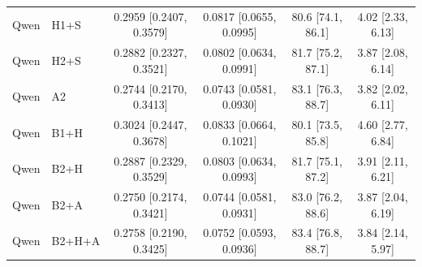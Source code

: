 \documentclass{article}
\begin{document}
\begin{table}[h]
{\begin{tabular}{llcccc}
Qwen & H1+S & 0.2959 [0.2407, 0.3579] & 0.0817 [0.0655, 0.0995] & 80.6 [74.1, 86.1] & 4.02 [2.33, 6.13] \\
Qwen & H2+S & 0.2882 [0.2327, 0.3521] & 0.0802 [0.0634, 0.0991] & 81.7 [75.2, 87.1] & 3.87 [2.08, 6.14] \\
Qwen & A2 & 0.2744 [0.2170, 0.3413] & 0.0743 [0.0581, 0.0930] & 83.1 [76.3, 88.7] & 3.82 [2.02, 6.11] \\
Qwen & B1+H & 0.3024 [0.2447, 0.3678] & 0.0833 [0.0664, 0.1021] & 80.1 [73.5, 85.8] & 4.60 [2.77, 6.84] \\
Qwen & B2+H & 0.2887 [0.2329, 0.3529] & 0.0803 [0.0634, 0.0993] & 81.7 [75.1, 87.2] & 3.91 [2.11, 6.21] \\
Qwen & B2+A & 0.2750 [0.2174, 0.3421] & 0.0744 [0.0581, 0.0931] & 83.0 [76.2, 88.6] & 3.87 [2.04, 6.19] \\
Qwen & B2+H+A & 0.2758 [0.2190, 0.3425] & 0.0752 [0.0593, 0.0936] & 83.4 [76.8, 88.7] & 3.84 [2.14, 5.97] \\
\bottomrule
\end{tabular}
}
\end{table}
\end{document}
